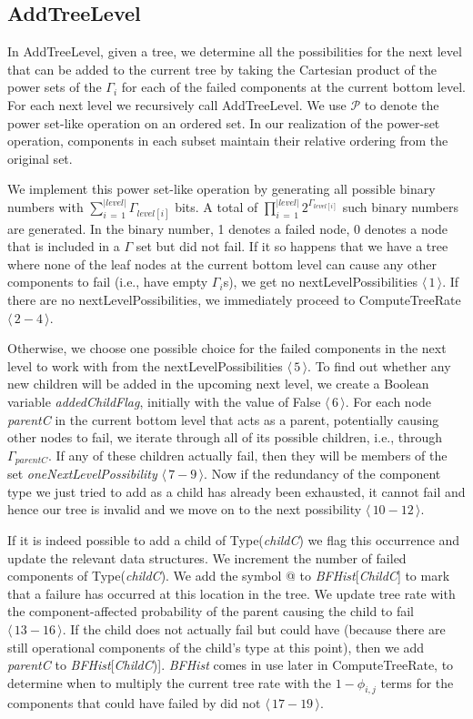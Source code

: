 \documentclass[12pt]{article}
\newcommand{\varName}[1]{\textrm{\it#1}}
\newcommand{\citeLine}[1]{$\langle\,#1\,\rangle$}
\newcommand{\citeBlock}[2]{$\langle\,#1 - #2\,\rangle$}
\begin{document}
\subsection{AddTreeLevel}

In AddTreeLevel, given a tree, we determine all the possibilities for the next level that can be added to the current tree by taking the Cartesian product of the power sets of the $\Gamma_{i}$ for each of the failed components at the current bottom level. For each next level we recursively call AddTreeLevel. We use $\mathcal{P}$ to denote the power set-like operation on an ordered set. In our realization of the power-set operation, components in each subset maintain their relative ordering from the original set.

We implement this power set-like operation by generating all possible binary numbers with $\sum\limits_{i\,=\,1}^{|level|}\Gamma_{level[i]}$ bits. A total of $\prod\limits_{i\,=\,1}^{|level|}2^{\Gamma_{level[i]}}$ such binary numbers are generated. In the binary number, 1 denotes a failed node, 0 denotes a node that is included in a $\Gamma$ set but did not fail. If it so happens that we have a tree where none of the leaf nodes at the current bottom level can cause any other components to fail (i.e., have empty $\Gamma_{i}$s), we get no nextLevelPossibilities \citeLine{1}. If there are no nextLevelPossibilities, we immediately proceed to ComputeTreeRate \citeBlock{2}{4}.

Otherwise, we choose one possible choice for the failed components in the next level to work with from the nextLevelPossibilities \citeLine{5}. To find out whether any new children will be added in the upcoming next level, we create a Boolean variable \varName{addedChildFlag}, initially with the value of False \citeLine{6}. For each node \varName{parentC} in the current bottom level that acts as a parent, potentially causing other nodes to fail, we iterate through all of its possible children, i.e., through $\Gamma_{parentC}$. If any of these children actually fail, then they will be members of the set \varName{oneNextLevelPossibility} \citeBlock{7}{9}. Now if the redundancy of the component type we just tried to add as a child has already been exhausted, it cannot fail and hence our tree is invalid and we move on to the next possibility \citeBlock{10}{12}.

If it is indeed possible to add a child of Type(\varName{childC}) we flag this occurrence and update the relevant data structures. We increment the number of failed components of Type(\varName{childC}). We add the symbol @ to \varName{BFHist}[\varName{ChildC}] to mark that a failure has occurred at this location in the tree. We update tree rate with the component-affected probability of the parent causing the child to fail \citeBlock{13}{16}. If the child does not actually fail but could have (because there are still operational components of the child's type at this point), then we add \varName{parentC} to \varName{BFHist}[\varName{ChildC})]. \varName{BFHist} comes in use later in ComputeTreeRate, to determine when to multiply the current tree rate with the $1-\phi_{i,j}$ terms for the components that could have failed by did not \citeBlock{17}{19}.
\end{document}
